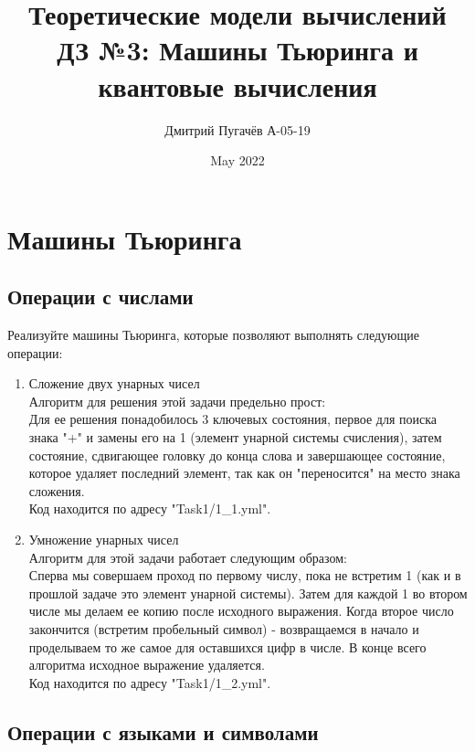 \documentclass{article}
\title{Теоретические модели вычислений \\
ДЗ №3: Машины Тьюринга и квантовые вычисления}
\author{Дмитрий Пугачёв А-05-19}
\date{May 2022}
\begin{document}
\maketitle


\section{Машины Тьюринга}

\subsection{Операции с числами}

Реализуйте машины Тьюринга, которые позволяют выполнять следующие операции:
\begin{enumerate}
    \item Сложение двух унарных чисел\\
    Алгоритм для решения этой задачи предельно прост:\\
    Для ее решения понадобилось 3 ключевых состояния, первое для поиска знака "+"\; и замены его на 1 (элемент унарной системы счисления), затем состояние, сдвигающее головку до конца слова и завершающее состояние, которое удаляет последний элемент, так как он "переносится" на место знака сложения.\\
    Код находится по адресу "Task1/1\_1.yml".\\
    \item Умножение унарных чисел\\
    Алгоритм для этой задачи работает следующим образом: \\
    Сперва мы совершаем проход по первому числу, пока не встретим 1 (как и в прошлой задаче это элемент унарной системы). Затем для каждой 1 во втором числе мы делаем ее копию после исходного выражения. Когда второе число закончится (встретим пробельный символ) - возвращаемся в начало и проделываем то же самое для оставшихся цифр в числе. В конце всего алгоритма исходное выражение удаляется.\\
    Код находится по адресу "Task1/1\_2.yml".\\
\end{enumerate}


\subsection{Операции с языками и символами}
\end{document}
